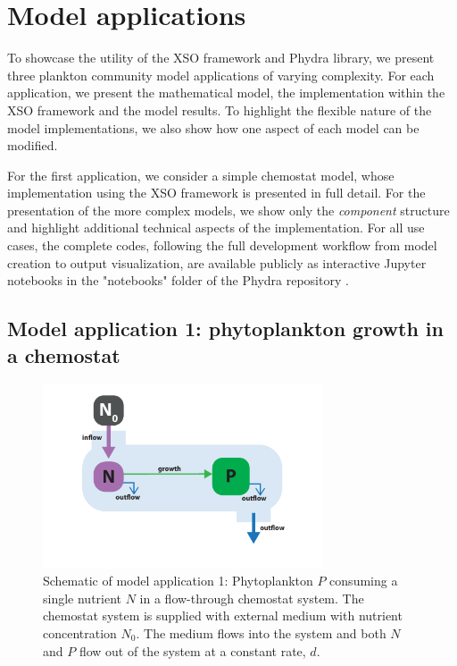 \documentclass[gmd, manuscript]{copernicus}
\begin{document}
\section{Model applications} \label{Section:UseCases}

To showcase the utility of the XSO framework and Phydra library, we present three plankton community model applications of varying complexity. For each application, we present the mathematical model, the implementation within the XSO framework and the model results. To highlight the flexible nature of the model implementations, we also show how one aspect of each model can be modified.

For the first application, we consider a simple chemostat model, whose implementation using the XSO framework is presented in full detail. For the presentation of the more complex models, we show only the \textit{component} structure and highlight additional technical aspects of the implementation. For all use cases, the complete codes, following the full development workflow from model creation to output visualization, are available publicly as interactive Jupyter notebooks in the "notebooks" folder of the Phydra repository \citep{Post2023Phydra}.

\subsection{Model application 1: phytoplankton growth in a chemostat}
\begin{figure}[t]
\includegraphics[width=8.3cm]{Figures/firstdraft_schematics/01_schematics_Chemostat.pdf}
\caption{Schematic of model application 1: Phytoplankton $P$ consuming a single nutrient $N$ in a flow-through chemostat system. The chemostat system is supplied with external medium with nutrient concentration $N_0$. The medium flows into the system and both $N$ and $P$ flow out of the system at a constant rate, $d$.}
\label{Figure:ModelSchematics_1}
\end{figure}
\end{document}
